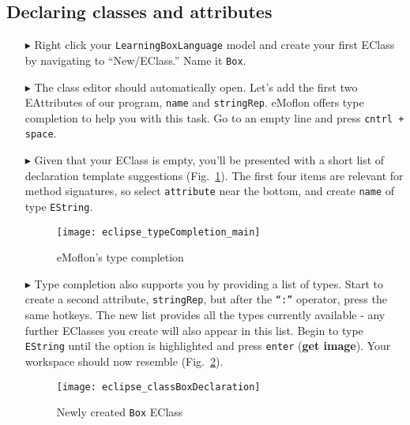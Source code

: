 \newpage
\subsection{Declaring classes and attributes}
\texHeader
\hypertarget{static:classes tex}{}

\begin{itemize}

\item[$\blacktriangleright$] Right click your \texttt{LearningBoxLanguage} model and create your first EClass by navigating to ``New/EClass.'' Name it
\texttt{Box}.

\item[$\blacktriangleright$] The class editor should automatically open. Let's add the first two EAttributes of our program, \texttt{name} and
\texttt{stringRep}. eMoflon offers type completion to help you with this task. Go to an empty line and press \texttt{cntrl + space}.

\item[$\blacktriangleright$] Given that your EClass is empty, you'll be presented with a short list of declaration template suggestions
(Fig.~\ref{fig:typeComp_Main}). The first four items are relevant for method signatures, so select \texttt{attribute} near the bottom, and create \texttt{name}
of type \texttt{EString}.

\begin{figure}[htbp]
	\centering
  \texttt{[image: eclipse\_typeCompletion\_main]}
	\caption{eMoflon's type completion}
	\label{fig:typeComp_Main}
\end{figure} 

\item[$\blacktriangleright$] Type completion also supports you by providing a list of types. Start to create a second attribute, \texttt{stringRep}, but after
the \texttt{``:''} operator, press the same hotkeys. The new list provides all the types currently available - any further EClasses you create will also appear
in this list. Begin to type \texttt{EString} until the option is highlighted and press \texttt{enter} ({\bf get image}). Your workspace should now resemble
(Fig.~\ref{fig:boxDeclaration}).

\begin{figure}[h!]
	\centering
  \texttt{[image: eclipse\_classBoxDeclaration]}
	\caption{Newly created \texttt{Box} EClass}
	\label{fig:boxDeclaration}
\end{figure} 
\FloatBarrier


\end{itemize}
